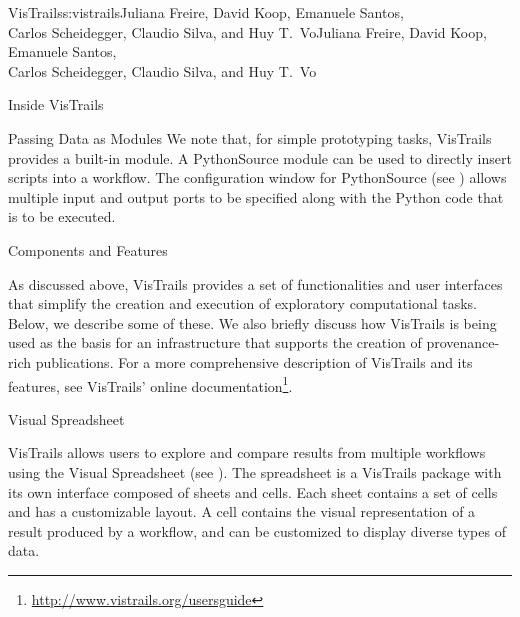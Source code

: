 \begin{aosachaptertoc}{VisTrails}{s:vistrails}{Juliana Freire, David Koop, Emanuele Santos, \\ Carlos Scheidegger, Claudio Silva, and Huy T.\ Vo}{Juliana Freire, David Koop, Emanuele Santos, \\ \hspace*{0.9cm} Carlos Scheidegger, Claudio Silva, and Huy T.\ Vo}
\begin{aosasect1}{Inside VisTrails}
\begin{aosasect2}{Passing Data as Modules}
We note that, for simple prototyping tasks, VisTrails provides a
built-in  module.  A PythonSource module can be
used to directly insert scripts into a workflow. The configuration
window for PythonSource (see )
allows multiple input and output ports to be specified along with the
Python code that is to be executed.

\end{aosasect2}

\end{aosasect1}

\begin{aosasect1}{Components and Features}

As discussed above, VisTrails provides a set of functionalities and
user interfaces that simplify the creation and execution of
exploratory computational tasks. Below, we describe some of these. We
also briefly discuss how VisTrails is being used as the basis for an
infrastructure that supports the creation of provenance-rich
publications. For a more comprehensive description of VisTrails and its features,
see VisTrails' online documentation\footnote{\url{http://www.vistrails.org/usersguide}}.


\begin{aosasect2}{Visual Spreadsheet}

VisTrails allows users to explore and compare results from multiple
workflows using the Visual Spreadsheet (see
). The spreadsheet is a
VisTrails package with its own interface composed of sheets and
cells. Each sheet contains a set of cells and has a customizable
layout.  A cell contains the visual representation of a result
produced by a workflow, and can be customized to display diverse types
of data.


\end{aosasect2}
\end{aosasect1}
\end{aosachaptertoc}
